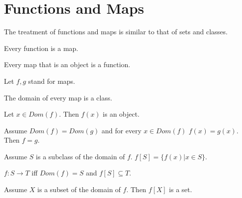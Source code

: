 \documentclass[11pt]{article}
\begin{document}
\section{Functions and Maps}
The treatment of functions and maps is similar to that
of sets and classes.
\begin{forthel}

\begin{lemma} Every function is a map.
\end{lemma}

\begin{lemma} Every map that is an object is a function.
\end{lemma}

Let $f,g$ stand for maps.

\begin{lemma} The domain of every map is a class.
\end{lemma}

\begin{lemma} Let $x \in Dom(f)$. Then $f(x)$ is an object.
\end{lemma}

\begin{lemma}  Assume $Dom(f)=Dom(g)$ and for every $x \in Dom(f)$
$f(x)=g(x)$. Then $f=g$.
\end{lemma}

\begin{definition}
Assume $S$ is a subclass of the domain of $f$.
$f[S] = \{ f(x) | x \in S \}$.
\end{definition}

\begin{definition}
$f : S \rightarrow T$ iff $Dom (f) = S$ and $f[S] \subseteq T$.
\end{definition}

\begin{axiom} 
Assume $X$ is a subset of the domain of $f$.
Then $f[X]$ is a set.
\end{axiom}
\end{forthel}
\end{document}
